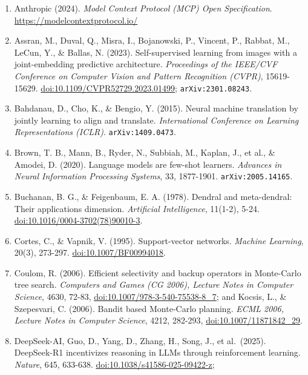 \documentclass[10pt,letterpaper]{article}
\begin{document}
\begin{enumerate}
  \texttt{arXiv:2507.\allowbreak{}21166}.
\item
  Anthropic (2024). \emph{Model Context Protocol (MCP) Open
  Specification}. \url{https://modelcontextprotocol.io/}
\item
  Assran, M., Duval, Q., Misra, I., Bojanowski, P., Vincent, P., Rabbat,
  M., LeCun, Y., \& Ballas, N. (2023). Self-supervised learning from
  images with a joint-embedding predictive architecture.
  \emph{Proceedings of the IEEE/CVF Conference on Computer Vision and
  Pattern Recognition (CVPR)}, 15619-15629.
  \href{https://doi.org/10.1109/CVPR52729.2023.01499}{doi:10.1109/CVPR52729.2023.01499};
  \texttt{arXiv:2301.\allowbreak{}08243}.
\item
  Bahdanau, D., Cho, K., \& Bengio, Y. (2015). Neural machine
  translation by jointly learning to align and translate.
  \emph{International Conference on Learning Representations (ICLR)}.
  \texttt{arXiv:1409.\allowbreak{}0473}.
\item
  Brown, T. B., Mann, B., Ryder, N., Subbiah, M., Kaplan, J., et al., \&
  Amodei, D. (2020). Language models are few-shot learners.
  \emph{Advances in Neural Information Processing Systems}, 33,
  1877-1901. \texttt{arXiv:2005.\allowbreak{}14165}.
\item
  Buchanan, B. G., \& Feigenbaum, E. A. (1978). Dendral and
  meta-dendral: Their applications dimension. \emph{Artificial
  Intelligence}, 11(1-2), 5-24.
  \href{https://doi.org/10.1016/0004-3702(78)90010-3}{doi:10.1016/0004-3702(78)90010-3}.
\item
  Cortes, C., \& Vapnik, V. (1995). Support-vector networks.
  \emph{Machine Learning}, 20(3), 273-297.
  \href{https://doi.org/10.1007/BF00994018}{doi:10.1007/BF00994018}.
\item
  Coulom, R. (2006). Efficient selectivity and backup operators in
  Monte-Carlo tree search. \emph{Computers and Games (CG 2006), Lecture
  Notes in Computer Science}, 4630, 72-83,
  \href{https://doi.org/10.1007/978-3-540-75538-8_7}{doi:10.1007/978-3-540-75538-8\_7};
  and Kocsis, L., \& Szepesvari, C. (2006). Bandit based Monte-Carlo
  planning. \emph{ECML 2006, Lecture Notes in Computer Science}, 4212,
  282-293,
  \href{https://doi.org/10.1007/11871842_29}{doi:10.1007/11871842\_29}.
\item
  DeepSeek-AI, Guo, D., Yang, D., Zhang, H., Song, J., et al.~(2025).
  DeepSeek-R1 incentivizes reasoning in LLMs through reinforcement
  learning. \emph{Nature}, 645, 633-638.
  \href{https://doi.org/10.1038/s41586-025-09422-z}{doi:10.1038/s41586-025-09422-z};

\end{enumerate}
\end{document}
